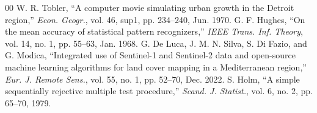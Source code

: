 \documentclass[conference]{IEEEtran}
\begin{document}
\begin{thebibliography}{00}
 W. R. Tobler, ``A computer movie simulating urban growth in the Detroit region,'' \textit{Econ. Geogr.}, vol. 46, sup1, pp. 234--240, Jun. 1970.
 G. F. Hughes, ``On the mean accuracy of statistical pattern recognizers,'' \textit{IEEE Trans. Inf. Theory}, vol. 14, no. 1, pp. 55--63, Jan. 1968.
 G. De Luca, J. M. N. Silva, S. Di Fazio, and G. Modica, ``Integrated use of Sentinel-1 and Sentinel-2 data and open-source machine learning algorithms for land cover mapping in a Mediterranean region,'' \textit{Eur. J. Remote Sens.}, vol. 55, no. 1, pp. 52--70, Dec. 2022.
 S. Holm, ``A simple sequentially rejective multiple test procedure,'' \textit{Scand. J. Statist.}, vol. 6, no. 2, pp. 65--70, 1979.
\end{thebibliography}
\end{document}
